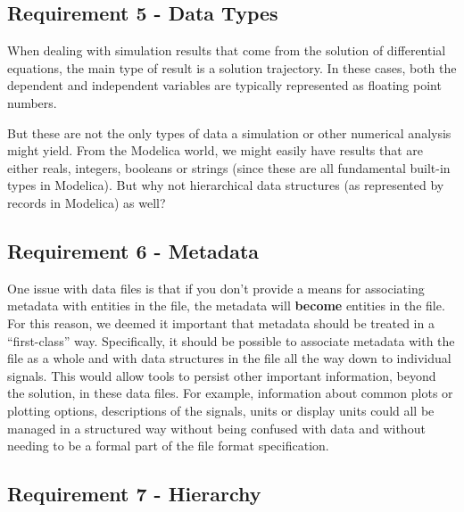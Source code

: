 \documentclass[11pt,a4paper,twocolumn]{article}
\begin{document}
\subsection{Requirement 5 - Data Types}


When dealing with simulation results that come from the solution of
differential equations, the main type of result is a solution
trajectory.  In these cases, both the dependent and independent
variables are typically represented as floating point numbers.

But these are not the only types of data a simulation or other
numerical analysis might yield.  From the Modelica world, we might
easily have results that are either reals, integers, booleans or strings
(since these are all fundamental built-in types in Modelica).  But why
not hierarchical data structures (as represented by records in
Modelica) as well?

\subsection{Requirement 6 - Metadata}


One issue with data files is that if you don't provide a means for
associating metadata with entities in the file, the metadata will
\textbf{become} entities in the file.  For this reason, we deemed it
important that metadata should be treated in a ``first-class'' way.
Specifically, it should be possible to associate metadata with the
file as a whole and with data structures in the file all the way down
to individual signals.  This would allow tools to persist other
important information, beyond the solution, in these data files.  For
example, information about common plots or plotting options,
descriptions of the signals, units or display units could all be
managed in a structured way without being confused with data and
without needing to be a formal part of the file format specification.

\subsection{Requirement 7 - Hierarchy}

\end{document}
